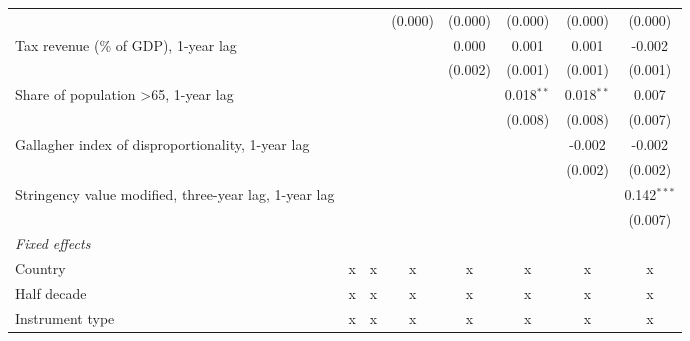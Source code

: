 \begin{tabular}{lccccccc}
                                                                      &                &               & (0.000)       & (0.000)       & (0.000)        & (0.000)        & (0.000)\\   
   Tax revenue (\% of GDP), 1-year lag                                &                &               &               & 0.000         & 0.001          & 0.001          & -0.002\\   
                                                                      &                &               &               & (0.002)       & (0.001)        & (0.001)        & (0.001)\\   
   Share of population >65, 1-year lag                                &                &               &               &               & 0.018$^{**}$   & 0.018$^{**}$   & 0.007\\   
                                                                      &                &               &               &               & (0.008)        & (0.008)        & (0.007)\\   
   Gallagher index of disproportionality, 1-year lag                  &                &               &               &               &                & -0.002         & -0.002\\   
                                                                      &                &               &               &               &                & (0.002)        & (0.002)\\   
   Stringency value modified, three-year lag, 1-year lag              &                &               &               &               &                &                & 0.142$^{***}$\\   
                                                                      &                &               &               &               &                &                & (0.007)\\   
   \emph{Fixed effects}\\
   Country                                                            & x              & x             & x             & x             & x              & x              & x\\  
   Half decade                                                        & x              & x             & x             & x             & x              & x              & x\\  
   Instrument type                                                    & x              & x             & x             & x             & x              & x              & x\\  

\end{tabular}
